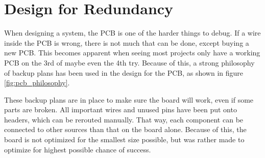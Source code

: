 \documentclass[../main/report.tex]{subfiles}
\begin{document}
\section{Design for Redundancy}

When designing a system, the PCB is one of the harder things to debug.
If a wire inside the PCB is wrong, there is not much that can be done, except buying a new PCB.
This becomes apparent when seeing most projects only have a working PCB on the 3rd of maybe even the 4th try. 
Because of this, a strong philosophy of backup plans has been used in the design for the PCB, as shown in figure \ref{fig:pcb_philosophy}.

These backup plans are in place to make sure the board will work, even if some parts are broken.
All important wires and unused pins have been put onto headers, which can be rerouted manually.
That way, each component can be connected to other sources than that on the board alone.
Because of this, the board is not optimized for the smallest size possible, but was rather made to optimize for highest possible chance of success.
\end{document}
